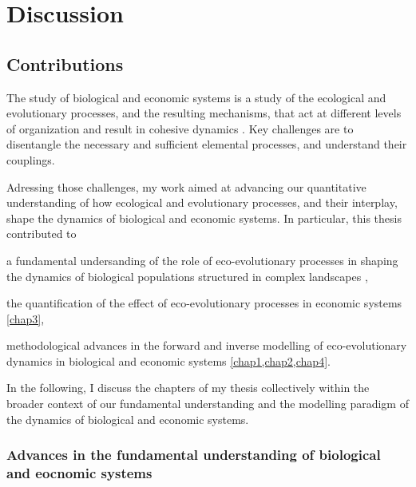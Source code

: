 %
\newcommand{\chapi}{\cref{diff-in-graphs}}
\newcommand{\chapii}{\cref{diff-in-graphs}}
\newcommand{\chapiii}{\cref{diff-in-graphs}}
\newcommand{\chapiv}{\cref{diff-in-graphs}}

\chapter{Discussion}
\label{sec:conclusion}



\section{Contributions}
The study of biological and economic systems is a study of the ecological and evolutionary processes, and the resulting mechanisms, that act at different levels of organization and result in cohesive dynamics \cite{Levin2002}.
% 
Key challenges are to disentangle the necessary and sufficient elemental processes, and understand their couplings. 

Adressing those challenges, my work aimed at advancing our quantitative understanding of how ecological and evolutionary processes, and their interplay, shape the dynamics of biological and economic systems. In particular, this thesis contributed to 
% 
\begin{mylisti}
    \item a fundamental undersanding of the role of eco-evolutionary processes in shaping the dynamics of biological populations structured in complex landscapes \cite{chap1},
    \item the quantification of the effect of eco-evolutionary processes in economic systems \cref{chap3},
    \item methodological advances in the forward and inverse modelling of eco-evolutionary dynamics in biological and economic systems \cref{chap1,chap2,chap4}.
\end{mylisti}

In the following, I discuss the chapters of my thesis collectively within the broader context of our fundamental understanding and the modelling paradigm of the dynamics of biological and economic systems.

\subsection{Advances in the fundamental understanding of biological and eocnomic systems}

